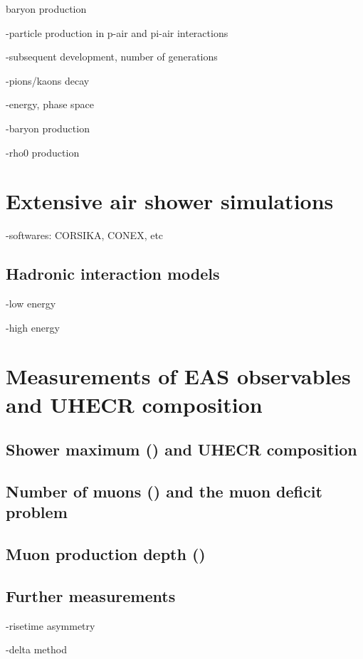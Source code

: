 baryon production



-particle production in p-air and pi-air interactions

-subsequent development, number of generations

-pions/kaons decay

-energy, phase space

-baryon production

-rho0 production

\cite{Calcagni:2017tws,Drescher:2007hc}


\section{Extensive air shower simulations}

-softwares: CORSIKA, CONEX, etc

\subsection{Hadronic interaction models}

-low energy

-high energy

\section{Measurements of EAS observables and UHECR composition}


\subsection{Shower maximum (\xmax) and UHECR composition}

\subsection{Number of muons (\nmu) and the muon deficit problem}

\subsection{Muon production depth (\xmumax)}

\subsection{Further measurements}

-risetime asymmetry

-delta method





